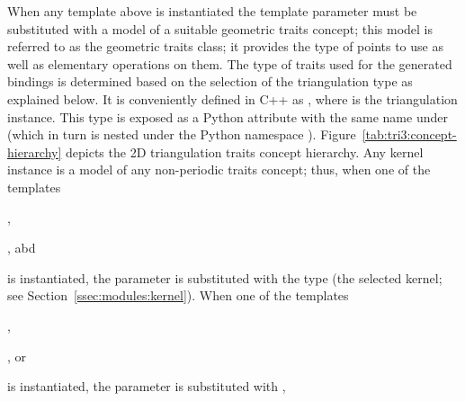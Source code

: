When any template above is instantiated the template parameter
 must be substituted with a model of a suitable
geometric traits concept; this model is referred to as the geometric
traits class; it provides the type of points to use as well as
elementary operations on them. The type of traits used for the
generated bindings is determined based on the selection of the
triangulation type as explained below. It is conveniently defined in
C++ as , where  is the
triangulation instance. This type is exposed as a Python attribute
with the same name under  (which in turn
is nested under the Python namespace ).
Figure~\ref{tab:tri3:concept-hierarchy} depicts the 2D triangulation
traits concept hierarchy. Any kernel instance is a model of any
non-periodic traits concept; thus, when one of the templates
\begin{compactenum}
\item {},
\item {}, abd
\item {}
\end{compactenum}
is instantiated, the  parameter is substituted
with the  type (the selected kernel; see
Section~\ref{ssec:modules:kernel}). When one of the templates
\begin{compactenum}
\item {},
\item {}, or
\item {}
\end{compactenum}
is instantiated, the  parameter is substituted
with ,
